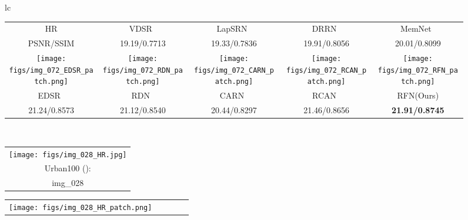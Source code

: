 \documentclass[preprint]{elsarticle}
\begin{document}
\begin{figure*}[htpb]
{\begin{tabular}{lc}
\begin{adjustbox}{valign=t}
\begin{tabular}{ccccc}
				HR & VDSR~\cite{VDSR} & LapSRN~\cite{LapSRN} & DRRN~\cite{DRRN} & MemNet~\cite{MemNet} \\
				PSNR/SSIM & 19.19/0.7713 & 19.33/0.7836 & 19.91/0.8056 & 20.01/0.8099 \\
				\texttt{[image: figs/img\_072\_EDSR\_patch.png]} &
				\hspace{-3mm}
				\texttt{[image: figs/img\_072\_RDN\_patch.png]} &
				\hspace{-3mm}
				\texttt{[image: figs/img\_072\_CARN\_patch.png]} &
				\hspace{-3mm}
				\texttt{[image: figs/img\_072\_RCAN\_patch.png]} &
				\hspace{-3mm}
				\texttt{[image: figs/img\_072\_RFN\_patch.png]} \\
				EDSR~\cite{EDSR} &\hspace{-3mm} RDN~\cite{RDN} &\hspace{-3mm} CARN~\cite{CARN} &\hspace{-3mm} RCAN~\cite{RCAN} &\hspace{-3mm} RFN(Ours) \\
				21.24/0.8573 &\hspace{-3mm} 21.12/0.8540 &\hspace{-3mm} 20.44/0.8297 &\hspace{-3mm} 21.46/0.8656 &\hspace{-3mm} \textbf{21.91/0.8745} \\
			\end{tabular}	
		\end{adjustbox}
		\\
		\begin{adjustbox}{valign=t}
			\scriptsize
			\begin{tabular}{c}
				\texttt{[image: figs/img\_028\_HR.jpg]} \\
				Urban100 (): \\
				img\_028 \\
			\end{tabular}
		\end{adjustbox}
		\hspace{-4mm}
		\begin{adjustbox}{valign=t}
			\scriptsize
			\begin{tabular}{ccccc}
				\texttt{[image: figs/img\_028\_HR\_patch.png]} &

\end{tabular}
\end{adjustbox}
\end{tabular}}
\end{figure*}
\end{document}

